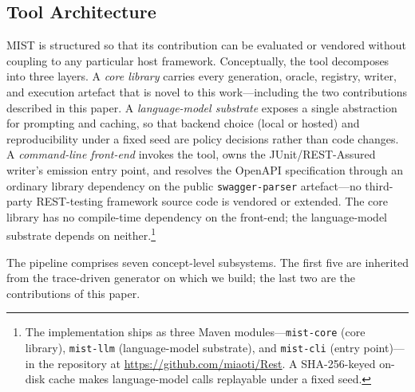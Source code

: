 \documentclass[conference]{IEEEtran}
\begin{document}
\subsection{Tool Architecture}\label{ssec:arch}
\textsc{MIST} is structured so that its contribution can be evaluated or vendored without coupling to any particular host framework. Conceptually, the tool decomposes into three layers. A \emph{core library} carries every generation, oracle, registry, writer, and execution artefact that is novel to this work---including the two contributions described in this paper. A \emph{language-model substrate} exposes a single abstraction for prompting and caching, so that backend choice (local or hosted) and reproducibility under a fixed seed are policy decisions rather than code changes. A \emph{command-line front-end} invokes the tool, owns the JUnit/REST-Assured writer's emission entry point, and resolves the OpenAPI specification through an ordinary library dependency on the public \texttt{swagger-parser} artefact---no third-party REST-testing framework source code is vendored or extended. The core library has no compile-time dependency on the front-end; the language-model substrate depends on neither.\footnote{The implementation ships as three Maven modules---\texttt{mist-core} (core library), \texttt{mist-llm} (language-model substrate), and \texttt{mist-cli} (entry point)---in the repository at \url{https://github.com/miaoti/Rest}. A SHA-256-keyed on-disk cache makes language-model calls replayable under a fixed seed.}

The pipeline comprises seven concept-level subsystems. The first five are inherited from the trace-driven generator on which we build; the last two are the contributions of this paper.
\end{document}
